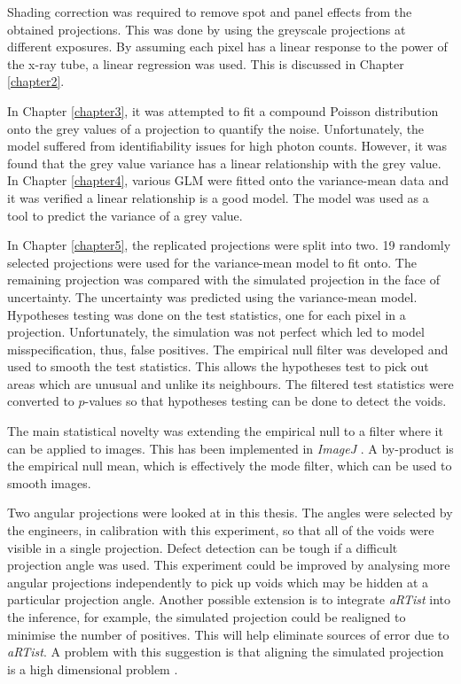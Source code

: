 \documentclass[12pt, a4paper, twoside]{memoir}
\begin{document}
Shading correction was required to remove spot and panel effects from the obtained projections. This was done by using the greyscale projections at different exposures. By assuming each pixel has a linear response to the power of the x-ray tube, a linear regression was used. This is discussed in Chapter \ref{chapter2}.

In Chapter \ref{chapter3}, it was attempted to fit a compound Poisson distribution onto the grey values of a projection to quantify the noise. Unfortunately, the model suffered from identifiability issues for high photon counts. However, it was found that the grey value variance has a linear relationship with the grey value. In Chapter \ref{chapter4}, various GLM were fitted onto the variance-mean data and it was verified a linear relationship is a good model. The model was used as a tool to predict the variance of a grey value.

In Chapter \ref{chapter5}, the replicated projections were split into two. 19 randomly selected projections were used for the variance-mean model to fit onto. The remaining projection was compared with the simulated projection in the face of uncertainty. The uncertainty was predicted using the variance-mean model. Hypotheses testing was done on the test statistics, one for each pixel in a projection. Unfortunately, the simulation was not perfect which led to model misspecification, thus, false positives. The empirical null filter was developed and used to smooth the test statistics. This allows the hypotheses test to pick out areas which are unusual and unlike its neighbours. The filtered test statistics were converted to $p$-values so that hypotheses testing can be done to detect the voids.

The main statistical novelty was extending the empirical null \citep{efron2004large} to a filter where it can be applied to images. This has been implemented in \emph{ImageJ} \citep{abramoff2004image, schneider2012nih, perez2013image}. A by-product is the empirical null mean, which is effectively the mode filter, which can be used to smooth images.

Two angular projections were looked at in this thesis. The angles were selected by the engineers, in calibration with this experiment, so that all of the voids were visible in a single projection. Defect detection can be tough if a difficult projection angle was used. This experiment could be improved by analysing more angular projections independently to pick up voids which may be hidden at a particular projection angle. Another possible extension is to integrate \emph{aRTist} into the inference, for example, the simulated projection could be realigned to minimise the number of positives. This will help eliminate sources of error due to \emph{aRTist}. A problem with this suggestion is that aligning the simulated projection is a high dimensional problem \citep{brierley2018optimized}.
\end{document}
